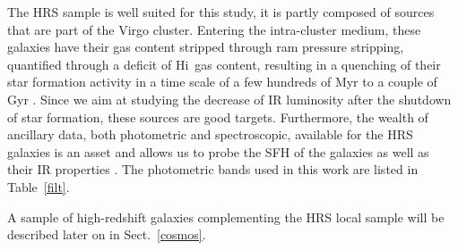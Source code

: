 \documentclass[traditabstract]{aa} %
\def \HI{{H{\sc i}}}
\begin{document}
The HRS sample is well suited for this study, it is partly composed of sources that are part of the Virgo cluster. 
Entering the intra-cluster medium, these galaxies have their gas content stripped through ram pressure stripping, quantified through a deficit of \HI\ gas content, resulting in a quenching of their star formation activity in a time scale of a few hundreds of Myr to a couple of Gyr \citep[see for instance][]{Boselli16}.
Since we aim at studying the decrease of IR luminosity after the shutdown of star formation, these sources are good targets.
Furthermore, the wealth of ancillary data, both photometric and spectroscopic, available for the HRS galaxies is an asset and allows us to probe the SFH of the galaxies as well as their IR properties \citep[][and from the literature]{Bendo12a,Cortese12b,Ciesla12,Cortese14,Ciesla14,Boselli13,Boselli14a,Boselli15}.
The photometric bands used in this work are listed in Table~\ref{filt}.

A sample of high-redshift galaxies complementing the HRS local sample will be described later on in Sect.~\ref{cosmos}.
\end{document}
